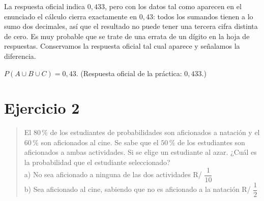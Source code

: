 \documentclass[11pt]{article}
\begin{document}
\begin{nota}
La respuesta oficial indica $0{,}433$, pero con los datos tal como aparecen en el enunciado el cálculo cierra exactamente en $0{,}43$: todos los sumandos tienen a lo sumo dos decimales, así que el resultado no puede tener una tercera cifra distinta de cero. Es muy probable que se trate de una errata de un dígito en la hoja de respuestas. Conservamos la respuesta oficial tal cual aparece y señalamos la diferencia.
\end{nota}

\begin{resp}
$P(A\cup B\cup C)=0{,}43$. \quad (Respuesta oficial de la práctica: $0{,}433$.)
\end{resp}

\section*{Ejercicio 2}

\begin{quote}
El $80\,\%$ de los estudiantes de probabilidades son aficionados a natación y el $60\,\%$ son aficionados al cine. Se sabe que el $50\,\%$ de los estudiantes son aficionados a ambas actividades. Si se elige un estudiante al azar. ¿Cuál es la probabilidad que el estudiante seleccionado?\\
a) No sea aficionado a ninguna de las dos actividades \hfill R/ $\dfrac{1}{10}$\\
b) Sea aficionado al cine, sabiendo que no es aficionado a la natación \hfill R/ $\dfrac{1}{2}$
\end{quote}
\end{document}
